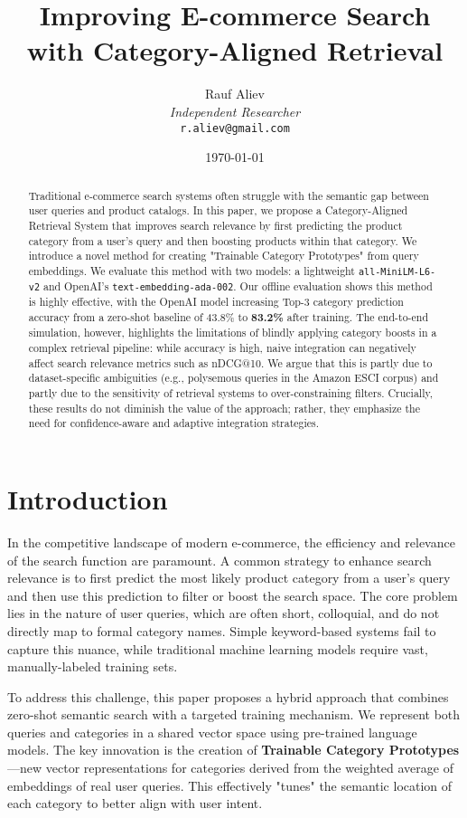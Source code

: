 \documentclass[12pt, a4paper]{article}
\title{Improving E-commerce Search \linebreak{}with Category-Aligned Retrieval}
\author{
Rauf Aliev \\
\textit{Independent Researcher} \\
\texttt{r.aliev@gmail.com}
}
\date{\today}
\begin{document}
\maketitle

\begin{abstract}
Traditional e-commerce search systems often struggle with the semantic gap between user queries and product catalogs. In this paper, we propose a Category-Aligned Retrieval System that improves search relevance by first predicting the product category from a user's query and then boosting products within that category. We introduce a novel method for creating "Trainable Category Prototypes" from query embeddings. We evaluate this method with two models: a lightweight \texttt{all-MiniLM-L6-v2} and OpenAI's \texttt{text-embedding-ada-002}. Our offline evaluation shows this method is highly effective, with the OpenAI model increasing Top-3 category prediction accuracy from a zero-shot baseline of 43.8\% to \textbf{83.2\%} after training. The end-to-end simulation, however, highlights the limitations of blindly applying category boosts in a complex retrieval pipeline: while accuracy is high, naive integration can negatively affect search relevance metrics such as nDCG@10. We argue that this is partly due to dataset-specific ambiguities (e.g., polysemous queries in the Amazon ESCI corpus) and partly due to the sensitivity of retrieval systems to over-constraining filters. Crucially, these results do not diminish the value of the approach; rather, they emphasize the need for confidence-aware and adaptive integration strategies.
\end{abstract}

\section{Introduction}

In the competitive landscape of modern e-commerce, the efficiency and relevance of the search function are paramount. A common strategy to enhance search relevance is to first predict the most likely product category from a user's query and then use this prediction to filter or boost the search space. The core problem lies in the nature of user queries, which are often short, colloquial, and do not directly map to formal category names. Simple keyword-based systems fail to capture this nuance, while traditional machine learning models require vast, manually-labeled training sets.

To address this challenge, this paper proposes a hybrid approach that combines zero-shot semantic search with a targeted training mechanism. We represent both queries and categories in a shared vector space using pre-trained language models. The key innovation is the creation of \textbf{Trainable Category Prototypes}—new vector representations for categories derived from the weighted average of embeddings of real user queries. This effectively "tunes" the semantic location of each category to better align with user intent.
\end{document}
